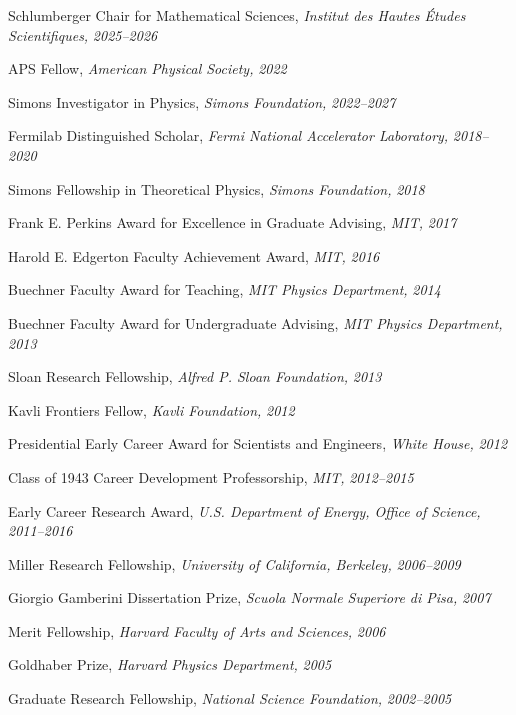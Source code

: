 \bbl
\item Schlumberger Chair for Mathematical Sciences, \emph{Institut des Hautes Études Scientifiques, }\emph{2025--2026}
\item APS Fellow, \emph{American Physical Society, }\emph{2022}
\item Simons Investigator in Physics, \emph{Simons Foundation, }\emph{2022--2027}
\item Fermilab Distinguished Scholar, \emph{Fermi National Accelerator Laboratory, }\emph{2018--2020}
\item Simons Fellowship in Theoretical Physics, \emph{Simons Foundation, }\emph{2018}
\item Frank E. Perkins Award for Excellence in Graduate Advising, \emph{MIT, }\emph{2017}
\item Harold E. Edgerton Faculty Achievement Award, \emph{MIT, }\emph{2016}
\item Buechner Faculty Award for Teaching, \emph{MIT Physics Department, }\emph{2014}
\item Buechner Faculty Award for Undergraduate Advising, \emph{MIT Physics Department, }\emph{2013}
\item Sloan Research Fellowship, \emph{Alfred P. Sloan Foundation, }\emph{2013}
\item Kavli Frontiers Fellow, \emph{Kavli Foundation, }\emph{2012}
\item Presidential Early Career Award for Scientists and Engineers, \emph{White House, }\emph{2012}
\item Class of 1943 Career Development Professorship, \emph{MIT, }\emph{2012--2015}
\item Early Career Research Award, \emph{U.S. Department of Energy, Office of Science, }\emph{2011--2016}
\item Miller Research Fellowship, \emph{University of California, Berkeley, }\emph{2006--2009}
\item Giorgio Gamberini Dissertation Prize, \emph{Scuola Normale Superiore di Pisa, }\emph{2007}
\item Merit Fellowship, \emph{Harvard Faculty of Arts and Sciences, }\emph{2006}
\item Goldhaber Prize, \emph{Harvard Physics Department, }\emph{2005}
\item Graduate Research Fellowship, \emph{National Science Foundation, }\emph{2002--2005}
\el
